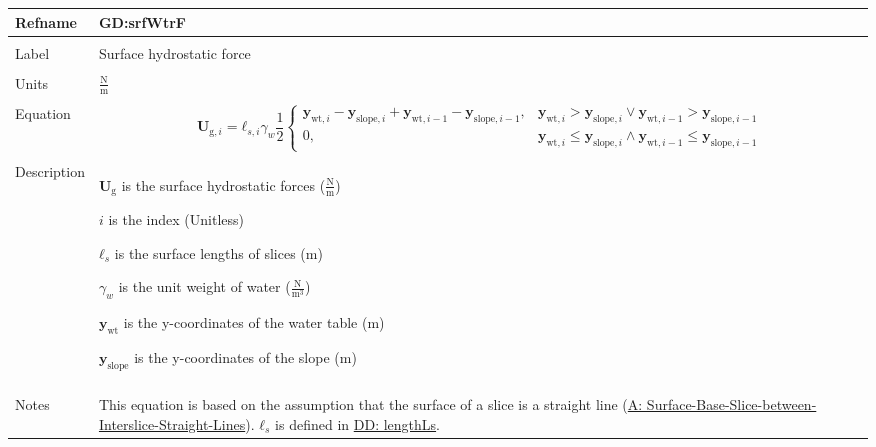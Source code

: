 \documentclass[12pt]{article}
\begin{document}
\vspace{\baselineskip}
\noindent
\begin{minipage}{\textwidth}
\begin{tabular}{>{\raggedright}p{}>{\raggedright\arraybackslash}p{}}
\toprule \textbf{Refname} & \textbf{GD:srfWtrF}
\label{GD:srfWtrF}
\\ \midrule \\
Label & Surface hydrostatic force
        
\\ \midrule \\
Units & $\frac{\text{N}}{\text{m}}$
        
\\ \midrule \\
Equation & \begin{displaymath}
           {\mathbf{U}_{\text{g},i}}={\mathbf{ℓ}_{s,i}} {γ_{w}} \frac{1}{2} \begin{cases}
                                                                            {\mathbf{y}_{\text{wt},i}}-{\mathbf{y}_{\text{slope},i}}+{\mathbf{y}_{\text{wt},i-1}}-{\mathbf{y}_{\text{slope},i-1}}, & {\mathbf{y}_{\text{wt},i}}>{\mathbf{y}_{\text{slope},i}}\lor{}{\mathbf{y}_{\text{wt},i-1}}>{\mathbf{y}_{\text{slope},i-1}}\\
                                                                            0, & {\mathbf{y}_{\text{wt},i}}\leq{}{\mathbf{y}_{\text{slope},i}}\land{}{\mathbf{y}_{\text{wt},i-1}}\leq{}{\mathbf{y}_{\text{slope},i-1}}
                                                                            \end{cases}
           \end{displaymath}
\\ \midrule \\
Description & \begin{symbDescription}
              \item{${\mathbf{U}_{\text{g}}}$ is the surface hydrostatic forces ($\frac{\text{N}}{\text{m}}$)}
              \item{$i$ is the index (Unitless)}
              \item{${\mathbf{ℓ}_{s}}$ is the surface lengths of slices (m)}
              \item{${γ_{w}}$ is the unit weight of water ($\frac{\text{N}}{\text{m}^{3}}$)}
              \item{${\mathbf{y}_{\text{wt}}}$ is the y-coordinates of the water table (m)}
              \item{${\mathbf{y}_{\text{slope}}}$ is the y-coordinates of the slope (m)}
              \end{symbDescription}
\\ \midrule \\
Notes & This equation is based on the assumption that the surface of a slice is a straight line (\hyperref[assumpSBSBISL]{A: Surface-Base-Slice-between-Interslice-Straight-Lines}). ${\mathbf{ℓ}_{s}}$ is defined in \hyperref[DD:lengthLs]{DD: lengthLs}.
        

\end{tabular}
\end{minipage}
\end{document}
